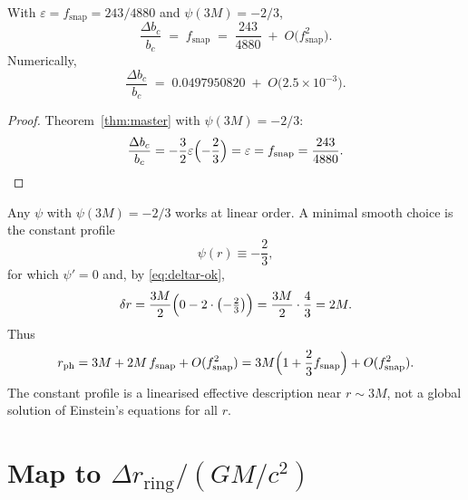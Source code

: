 \begin{theorem}
\label{thm:explicit}
With \(\varepsilon=f_{\mathrm{snap}}=243/4880\) and \(\psi(3M)=-2/3\),
\begin{equation}
\boxed{
\frac{\Delta b_c}{b_c}
\;=\;
f_{\mathrm{snap}}
\;=\;
\frac{243}{4880}
\;+\;O\!\bigl(f_{\mathrm{snap}}^2\bigr).
}
\label{eq:result}
\end{equation}
Numerically,
\[
\frac{\Delta b_c}{b_c}
\;=\;
0.0497950820
\;+\;O\!\bigl(2.5\times 10^{-3}\bigr).
\]
\end{theorem}

\begin{proof}
Theorem~\ref{thm:master} with \(\psi(3M)=-2/3\):
\[
\frac{\Delta b_c}{b_c}
=
-\frac{3}{2}\varepsilon\Bigl(-\frac{2}{3}\Bigr)
=
\varepsilon
=
f_{\mathrm{snap}}
=
\frac{243}{4880}.
\]
\end{proof}

\begin{corollary}
\label{cor:profile}
Any \(\psi\) with \(\psi(3M)=-2/3\) works at linear order. A minimal smooth choice
is the constant profile
\begin{equation}
\label{eq:const-psi}
\psi(r)\equiv -\frac{2}{3},
\end{equation}
for which \(\psi'=0\) and, by \eqref{eq:deltar-ok},
\[
\delta r
=
\frac{3M}{2}\Bigl(0-2\cdot\bigl(-\tfrac{2}{3}\bigr)\Bigr)
=
\frac{3M}{2}\cdot\frac{4}{3}
=
2M.
\]
Thus
\[
r_{\mathrm{ph}}
=
3M+2M\,f_{\mathrm{snap}}+O(f_{\mathrm{snap}}^2)
=
3M\Bigl(1+\frac{2}{3}f_{\mathrm{snap}}\Bigr)+O(f_{\mathrm{snap}}^2).
\]
The constant profile is a linearised effective description near \(r\sim 3M\),
not a global solution of Einstein's equations for all \(r\).
\end{corollary}

\section{Map to \(\Delta r_{\mathrm{ring}}/(GM/c^2)\)}
\label{sec:map}

